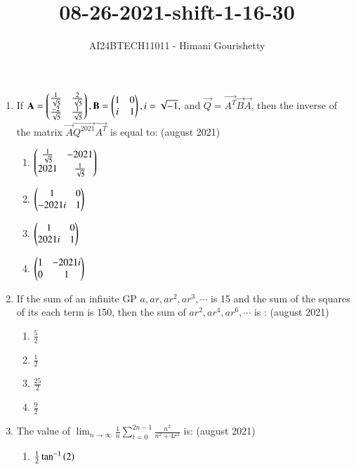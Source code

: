 \documentclass[journal,12pt,onecolumn]{IEEEtran}
\theoremstyle{remark}
\begin{document}

\vspace{3cm}

\title{08-26-2021-shift-1-16-30}
\author{AI24BTECH11011 - Himani Gourishetty}
\maketitle
\bigskip

\renewcommand{\thefigure}{\theenumi}
\renewcommand{\thetable}{\theenumi}
\begin{enumerate}
        \item If $\mathbf{A}=\begin{pmatrix}\frac{1}{\sqrt{5}}&\frac{2}{\sqrt{5}}\\\frac{-2}{\sqrt{5}}&\frac{1}{\sqrt{5}}\end{pmatrix},\mathbf{B}=\begin{pmatrix}1&0\\i&1\end{pmatrix},i=\sqrt{-1},$ and $\vec{Q}=\vec{A^{T}}\vec{B}\vec{A}$, then the inverse of the matrix $\vec{A}\vec{Q^{2021}}\vec{A^{T}}$ is equal to:
		\hfill{(august 2021)}
		\begin{enumerate}
            \item $\begin{pmatrix}\frac{1}{\sqrt{5}}&-2021\\2021&\frac{1}{\sqrt{5}}\end{pmatrix}$
            \item $\begin{pmatrix}1&0\\-2021i&1\end{pmatrix}$
            \item $\begin{pmatrix}1&0\\2021i&1\end{pmatrix}$
            \item $\begin{pmatrix}1&-2021i\\0&1\end{pmatrix}$
        \end{enumerate}
        \item If the sum of an infinite GP $a, ar, ar^{2}, ar^{3},\cdots$ is 15 and the sum of the squares of its each term is 150, then the sum of $ar^{2}, ar^{4}, ar^{6}, \cdots$ is :
        \hfill{(august 2021)}  
	\begin{enumerate}
            \item $\frac{5}{2}$
            \item $\frac{1}{2}$
            \item $\frac{25}{2}$
            \item $\frac{9}{2}$
        \end{enumerate}
        \item The value of $\lim_{n \to \infty}\frac{1}{n}\sum_{t=0}^{2n-1}\frac{n^{2}}{n^{2}+4r^{2}}$ is:
         \hfill{(august 2021)}  
		\begin{enumerate}
            \item $\frac{1}{2}\tan^{-1}\left(2\right)$

\end{enumerate}
\end{enumerate}
\end{document}
